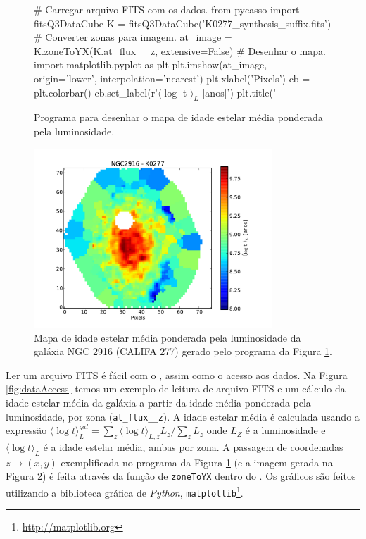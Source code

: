 \begin{figure}
	\begin{python}
# Carregar arquivo FITS com os dados.
from pycasso import fitsQ3DataCube
K = fitsQ3DataCube('K0277_synthesis_suffix.fits')
# Converter zonas para imagem.
at_image = K.zoneToYX(K.at_flux__z, extensive=False)
# Desenhar o mapa.
import matplotlib.pyplot as plt
plt.imshow(at_image, origin='lower', interpolation='nearest')
plt.xlabel('Pixels')
cb = plt.colorbar()
cb.set_label(r'$\langle \log$ t $\rangle_L$ [anos]')
plt.title('%
	\end{python}
	\caption[Programa idade estelar média.]
	{Programa para desenhar o mapa de idade	estelar média ponderada pela luminosidade.}
	\label{fig:programaMapaIdade}
\end{figure}

\begin{figure}
	\includegraphics[width=0.8\textwidth]{figuras/K0277-at_flux_zone.pdf}
	\caption[Mapa da idade estelar média da galáxia NGC 2916 (CALIFA 277).] 
	{Mapa de idade estelar média ponderada pela luminosidade da galáxia NGC 2916 (CALIFA 277) gerado pelo programa da
	Figura \ref{fig:programaMapaIdade}.}
	\label{fig:mapaIdade}
\end{figure}

Ler um arquivo FITS é fácil com o \pycasso, assim como o acesso aos dados. Na Figura \ref{fig:dataAccess} temos um
exemplo de leitura de arquivo FITS e um cálculo da idade estelar média da galáxia a partir da idade média ponderada pela
luminosidade, por zona (\texttt{at\_flux\_\_z}). A idade estelar média é calculada usando a expressão $ \langle \log t
\rangle^{gal}_L = \sum_z \langle \log t \rangle_{L,z} L_z /\sum_z L_z$ onde $L_Z $ é a luminosidade e $ \langle \log t
\rangle_L $ é a idade estelar média, ambas por zona. A passagem de coordenadas $z \to (x, y)$ exemplificada no programa
da Figura \ref{fig:programaMapaIdade} (e a imagem gerada na Figura \ref{fig:mapaIdade}) é feita através da função de
\texttt{zoneToYX} dentro do \pycasso. Os gráficos são feitos utilizando a biblioteca gráfica de {\em Python},
\texttt{matplotlib}\footnote{\url{http://matplotlib.org}}.

